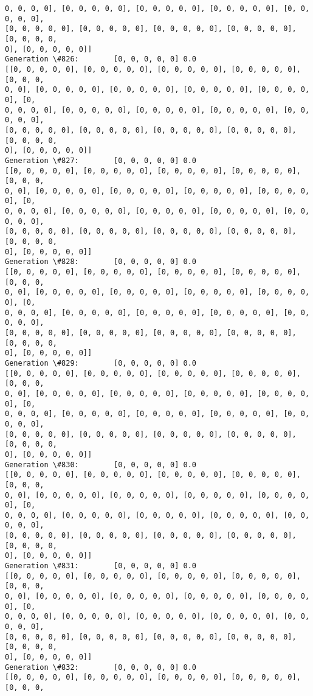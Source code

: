 \documentclass[11pt]{article}
\begin{document}
\begin{Verbatim}[commandchars=\\\{\}]
0, 0, 0, 0], [0, 0, 0, 0, 0], [0, 0, 0, 0, 0], [0, 0, 0, 0, 0], [0, 0, 0, 0, 0],
[0, 0, 0, 0, 0], [0, 0, 0, 0, 0], [0, 0, 0, 0, 0], [0, 0, 0, 0, 0], [0, 0, 0, 0,
0], [0, 0, 0, 0, 0]]
Generation \#826:        [0, 0, 0, 0, 0] 0.0
[[0, 0, 0, 0, 0], [0, 0, 0, 0, 0], [0, 0, 0, 0, 0], [0, 0, 0, 0, 0], [0, 0, 0,
0, 0], [0, 0, 0, 0, 0], [0, 0, 0, 0, 0], [0, 0, 0, 0, 0], [0, 0, 0, 0, 0], [0,
0, 0, 0, 0], [0, 0, 0, 0, 0], [0, 0, 0, 0, 0], [0, 0, 0, 0, 0], [0, 0, 0, 0, 0],
[0, 0, 0, 0, 0], [0, 0, 0, 0, 0], [0, 0, 0, 0, 0], [0, 0, 0, 0, 0], [0, 0, 0, 0,
0], [0, 0, 0, 0, 0]]
Generation \#827:        [0, 0, 0, 0, 0] 0.0
[[0, 0, 0, 0, 0], [0, 0, 0, 0, 0], [0, 0, 0, 0, 0], [0, 0, 0, 0, 0], [0, 0, 0,
0, 0], [0, 0, 0, 0, 0], [0, 0, 0, 0, 0], [0, 0, 0, 0, 0], [0, 0, 0, 0, 0], [0,
0, 0, 0, 0], [0, 0, 0, 0, 0], [0, 0, 0, 0, 0], [0, 0, 0, 0, 0], [0, 0, 0, 0, 0],
[0, 0, 0, 0, 0], [0, 0, 0, 0, 0], [0, 0, 0, 0, 0], [0, 0, 0, 0, 0], [0, 0, 0, 0,
0], [0, 0, 0, 0, 0]]
Generation \#828:        [0, 0, 0, 0, 0] 0.0
[[0, 0, 0, 0, 0], [0, 0, 0, 0, 0], [0, 0, 0, 0, 0], [0, 0, 0, 0, 0], [0, 0, 0,
0, 0], [0, 0, 0, 0, 0], [0, 0, 0, 0, 0], [0, 0, 0, 0, 0], [0, 0, 0, 0, 0], [0,
0, 0, 0, 0], [0, 0, 0, 0, 0], [0, 0, 0, 0, 0], [0, 0, 0, 0, 0], [0, 0, 0, 0, 0],
[0, 0, 0, 0, 0], [0, 0, 0, 0, 0], [0, 0, 0, 0, 0], [0, 0, 0, 0, 0], [0, 0, 0, 0,
0], [0, 0, 0, 0, 0]]
Generation \#829:        [0, 0, 0, 0, 0] 0.0
[[0, 0, 0, 0, 0], [0, 0, 0, 0, 0], [0, 0, 0, 0, 0], [0, 0, 0, 0, 0], [0, 0, 0,
0, 0], [0, 0, 0, 0, 0], [0, 0, 0, 0, 0], [0, 0, 0, 0, 0], [0, 0, 0, 0, 0], [0,
0, 0, 0, 0], [0, 0, 0, 0, 0], [0, 0, 0, 0, 0], [0, 0, 0, 0, 0], [0, 0, 0, 0, 0],
[0, 0, 0, 0, 0], [0, 0, 0, 0, 0], [0, 0, 0, 0, 0], [0, 0, 0, 0, 0], [0, 0, 0, 0,
0], [0, 0, 0, 0, 0]]
Generation \#830:        [0, 0, 0, 0, 0] 0.0
[[0, 0, 0, 0, 0], [0, 0, 0, 0, 0], [0, 0, 0, 0, 0], [0, 0, 0, 0, 0], [0, 0, 0,
0, 0], [0, 0, 0, 0, 0], [0, 0, 0, 0, 0], [0, 0, 0, 0, 0], [0, 0, 0, 0, 0], [0,
0, 0, 0, 0], [0, 0, 0, 0, 0], [0, 0, 0, 0, 0], [0, 0, 0, 0, 0], [0, 0, 0, 0, 0],
[0, 0, 0, 0, 0], [0, 0, 0, 0, 0], [0, 0, 0, 0, 0], [0, 0, 0, 0, 0], [0, 0, 0, 0,
0], [0, 0, 0, 0, 0]]
Generation \#831:        [0, 0, 0, 0, 0] 0.0
[[0, 0, 0, 0, 0], [0, 0, 0, 0, 0], [0, 0, 0, 0, 0], [0, 0, 0, 0, 0], [0, 0, 0,
0, 0], [0, 0, 0, 0, 0], [0, 0, 0, 0, 0], [0, 0, 0, 0, 0], [0, 0, 0, 0, 0], [0,
0, 0, 0, 0], [0, 0, 0, 0, 0], [0, 0, 0, 0, 0], [0, 0, 0, 0, 0], [0, 0, 0, 0, 0],
[0, 0, 0, 0, 0], [0, 0, 0, 0, 0], [0, 0, 0, 0, 0], [0, 0, 0, 0, 0], [0, 0, 0, 0,
0], [0, 0, 0, 0, 0]]
Generation \#832:        [0, 0, 0, 0, 0] 0.0
[[0, 0, 0, 0, 0], [0, 0, 0, 0, 0], [0, 0, 0, 0, 0], [0, 0, 0, 0, 0], [0, 0, 0,

\end{Verbatim}
\end{document}
